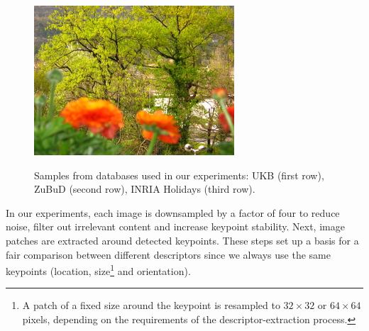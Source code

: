 \documentclass[10pt,conference,a4paper]{IEEEtran}
\begin{document}
\begin{figure}
{				\includegraphics[scale=0.82]{inria6.jpg}
			}

			\caption
			{
				Samples from databases used in our experiments:
				UKB \cite{ukb} (first row),
				ZuBuD \cite{zubud} (second row),
				INRIA Holidays \cite{holidays} (third row).
			}
			\label{fig:databases}
		\end{figure}

		In our experiments, each image is downsampled by a factor of four to reduce noise, filter out irrelevant content and increase keypoint stability.
		Next, image patches are extracted around detected keypoints.
		These steps set up a basis for a fair comparison between different descriptors since we always use the same keypoints
		(location, size\footnote{A patch of a fixed size around the keypoint is resampled to $32\times 32$ or $64\times 64$ pixels, depending on the requirements of the descriptor-extraction process.} and orientation).
\end{document}
